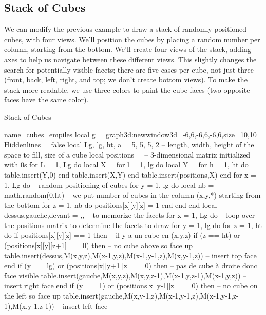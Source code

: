 \subsection{Stack of Cubes}

We can modify the previous example to draw a stack of randomly positioned cubes, with four views. We'll position the cubes by placing a random number per column, starting from the bottom. We'll create four views of the stack, adding axes to help us navigate between these different views. This slightly changes the search for potentially visible facets; there are five cases per cube, not just three (front, back, left, right, and top; we don't create bottom views). To make the stack more readable, we use three colors to paint the cube faces (two opposite faces have the same color).

\begin{demo}{Stack of Cubes}
\begin{luadraw}{name=cubes_empiles}
local g = graph3d:new{window3d={-6,6,-6,6,-6,6},size={10,10}}
Hiddenlines = false
local Lg, lg, ht, a = 5, 5, 5, 2 -- length, width, height of the space to fill, size of a cube
local positions = {} -- 3-dimensional matrix initialized with 0s
for L = 1, Lg do
    local X = {}
    for l = 1, lg do
        local Y = {}
        for h = 1, ht do table.insert(Y,0) end
        table.insert(X,Y)
    end
    table.insert(positions,X)
end
for x = 1, Lg do  -- random positioning of cubes
    for y = 1, lg do
        local nb = math.random(0,ht) -- we put number of cubes in the column (x,y,*) starting from the bottom
        for z = 1, nb do positions[x][y][z] = 1 end
    end
end
local dessus,gauche,devant = {},{},{} -- to memorize the facets
for x = 1, Lg do -- loop over the positions matrix to determine the facets to draw
    for y = 1, lg do
        for z = 1, ht do
            if positions[x][y][z] == 1 then -- il y a un cube en (x,y,z)
                if (z == ht) or (positions[x][y][z+1] == 0) then -- no cube above so face up
                    table.insert(dessus,{M(x,y,z),M(x-1,y,z),M(x-1,y-1,z),M(x,y-1,z)}) -- insert top face
                end
                if (y == lg) or (positions[x][y+1][z] == 0) then -- pas de cube à droite donc face  visible
                    table.insert(gauche,{M(x,y,z),M(x,y,z-1),M(x-1,y,z-1),M(x-1,y,z)}) -- insert right face
                end
                if (y == 1) or (positions[x][y-1][z] == 0) then -- no cube on the left so face up
                    table.insert(gauche,{M(x,y-1,z),M(x-1,y-1,z),M(x-1,y-1,z-1),M(x,y-1,z-1)}) -- insert left face

\end{luadraw}
\end{demo}
